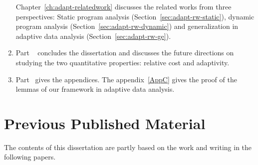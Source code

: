 \begin{enumerate}
Chapter~\ref{ch:adapt-relatedwork} discusses the related works from three perspectives: Static program analysis (Section~\ref{sec:adapt-rw-static}), dynamic program analysis (Section~\ref{sec:adapt-rw-dynamic}) and generalization in adaptive data analysis (Section~\ref{sec:adapt-rw-ge}).  
\item Part  ~ concludes the dissertation and discusses the future directions on studying the two quantitative properties: relative cost and adaptivity.
\item Part  ~gives the appendices. 
 The appendix~\ref{AppC} gives the proof of the lemmas of our framework in adaptive data analysis.    
\end{enumerate}



\section{Previous Published Material}
The contents of this dissertation are partly based on the work and writing in the following papers.



